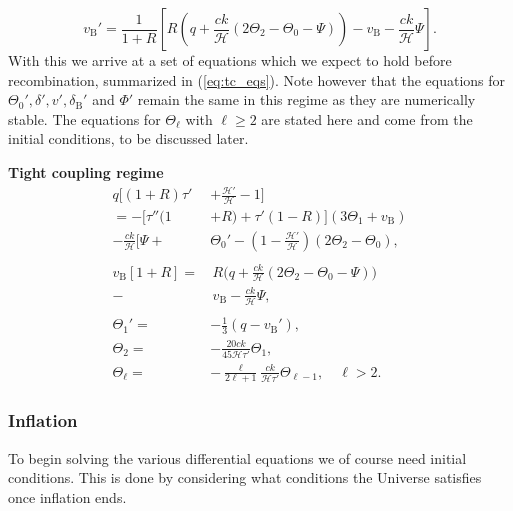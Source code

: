 \documentclass[%
reprint,
 amsmath,amssymb,
 aps,
]{revtex4-2}
\newcommand{\Hp}{\mathcal{H}}
\begin{document}
\[v_\text{B}'=\frac{1}{1+R}\left[R\left(q+\frac{ck}{\Hp}\left(2\Theta_2-\Theta_0-\Psi\right)\right)-v_\text{B}-\frac{ck}{\Hp}\Psi\right].\]
With this we arrive at a set of equations which we expect to hold before recombination, summarized in (\ref{eq:tc_eqs}). Note however that the equations for $\Theta_0',\delta',v',\delta_\text{B}'$ and $\Phi'$ remain the same in this regime as they are numerically stable. The equations for $\Theta_\ell$ with $\ell\geq2$ are stated here and come from the initial conditions, to be discussed later.
\begin{tcolorbox}[
	width=\linewidth,
	colback=black!3!white,
	]
	\textbf{Tight coupling regime}
	\begin{subequations}\label{eq:tc_eqs}
		\begin{align}
			q\biggl[(1+R)\tau'&+\frac{\Hp'}{\Hp}-1\biggr]\nonumber\\
			=-\bigl[\tau''(1&+R)+\tau'(1-R)\bigr](3\Theta_1+v_\text{B})\nonumber\\
			-\frac{ck}{\Hp}\biggl[\Psi+&\Theta_0'-\left(1-\frac{\Hp'}{\Hp}\right)(2\Theta_2-\Theta_0),\\
			\nonumber\\
			v_\text{B}[1+R]=&\,R\biggl(q+\frac{ck}{\Hp}\left(2\Theta_2-\Theta_0-\Psi\right)\biggr)\nonumber\\
			-&\,v_\text{B}-\frac{ck}{\Hp}\Psi,\\
			\nonumber\\
			\Theta_1'=&-\frac{1}{3}(q-v_\text{B}'),\\
			\Theta_2=&-\frac{20ck}{45\Hp\tau'}\Theta_1,\\
			\Theta_\ell=&-\frac{\ell}{2\ell+1}\frac{ck}{\Hp\tau'}\Theta_{\ell-1},\quad \ell>2.
		\end{align}
	\end{subequations}
\end{tcolorbox}



\subsubsection{Inflation}
To begin solving the various differential equations we of course need initial conditions. This is done by considering what conditions the Universe satisfies once inflation ends. 
\end{document}
